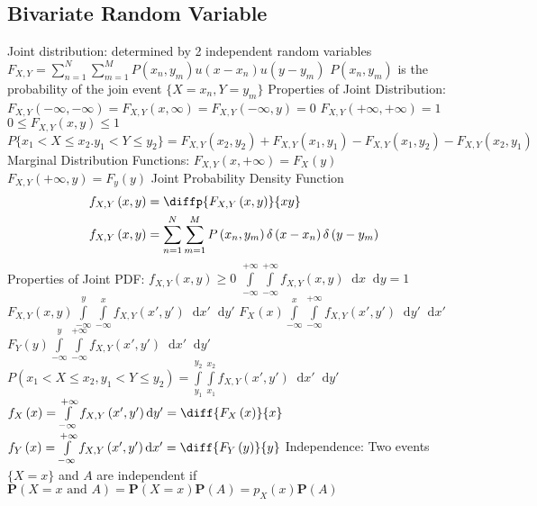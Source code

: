 \documentclass[a4paper,11pt]{article}
\newcommand*\dd{\mathop{}\!\mathrm{d}}
\newcommand{\bvec}[1]{\mathbf{#1}}
\begin{document}
	\subsection{Bivariate Random Variable}
	\begin{outline}[enumerate]
		\1 Joint distribution: determined by 2 independent random variables
			\2 $F_{X, Y} = \sum_{n = 1}^{N}\sum_{m = 1}^{M}P\left(x_{n}, y_{m}\right)u\left(x - x_{n}\right)u\left(y - y_{m}\right)$
			\2 $P\left(x_{n}, y_{m}\right)$ is the probability of the join event $\{X = x_{n}, Y = y_{m}\}$
		\1 Properties of Joint Distribution:
			\2 $F_{X, Y}\left(-\infty, -\infty\right) = F_{X, Y}\left(x, \infty\right) = F_{X, Y}\left(-\infty, y\right) = 0$
			\2 $F_{X, Y}\left(+\infty, +\infty\right) = 1$
			\2 $0 \leq F_{X, Y}\left(x, y\right) \leq 1$
			\2 $P\{x_{1} < X \leq x_{2}. y_{1} < Y \leq y_{2}\} = F_{X, Y}\left(x_{2}, y_{2}\right) + F_{X, Y}\left(x_{1}, y_{1}\right) - F_{X, Y}\left(x_{1}, y_{2}\right) - F_{X, Y}\left(x_{2}, y_{1}\right)$	
			\2 Marginal Distribution Functions:
				\3 $F_{X, Y}\left(x, +\infty\right) = F_{X}(y)$
				\3 $F_{X, Y}\left(+\infty, y\right) = F_{y}(y)$
		\1 Joint Probability Density Function
			\begin{align}
				f_{X, Y}\left(x, y\right) &= \diffp{F_{X, Y}\left(x, y\right)}{{x}{y}} \\
				f_{X, Y}\left(x, y\right) &= \sum_{n = 1}^{N}\sum_{m = 1}^{M}P\left(x_{n}, y_{m}\right)\delta \left(x - x_{n}\right)\delta \left(y - y_{m}\right)
			\end{align}		
		\1 Properties of Joint PDF:
			\2 $f_{X, Y}\left(x, y\right) \geq 0$
			\2 $\int\limits_{-\infty}^{+\infty} \int\limits_{-\infty}^{+\infty} f_{X, Y}\left(x, y\right) \dd x \dd y = 1$	
			\2 $F_{X, Y}\left(x, y\right) \int\limits_{-\infty}^{y} \int\limits_{-\infty}^{x} f_{X, Y}\left(x', y'\right) \dd x' \dd y'$
			\2 $F_{X}\left(x\right) \int\limits_{-\infty}^{x} \int\limits_{-\infty}^{+\infty} f_{X, Y}\left(x', y'\right) \dd y' \dd x'$
			\2 $F_{Y}\left(y\right) \int\limits_{-\infty}^{y} \int\limits_{-\infty}^{+\infty} f_{X, Y}\left(x', y'\right) \dd x' \dd y'$
			\2 $P\left(x_{1} < X \leq x_{2}, y_{1} < Y\leq y_{2}\right) = \int\limits_{y_{1}}^{y_{2}} \int\limits_{x_{1}}^{x_{2}} f_{X, Y}\left(x', y'\right) \dd x' \dd y'$
			\2 $f_{X}\left(x\right) = \int\limits_{-\infty}^{+\infty} f_{X, Y}\left(x', y'\right) \dd y' = \diff{F_{X}\left(x\right)}{x}$
			\2 $f_{Y}\left(x\right) = \int\limits_{-\infty}^{+\infty} f_{X, Y}\left(x', y'\right) \dd x' = \diff{F_{Y}\left(y\right)}{y}$
		\1 Independence: Two events $\{X = x\}$ and $A$ are independent if $\bvec{P}\left(X = x \text{ and } A\right) = \bvec{P}\left(X = x\right)\bvec{P}\left(A\right) = p_{X}\left(x\right)\bvec{P}\left(A\right)$	

\end{outline}
\end{document}

